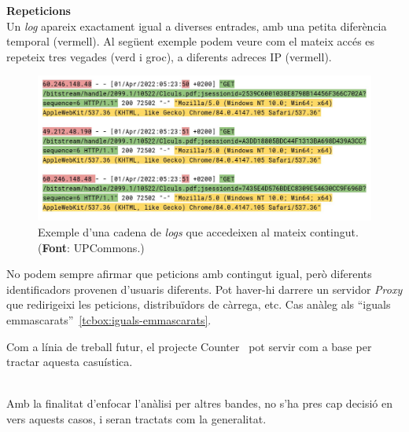 \clearpage

\noindent
\textbf{Repeticions} \\

\noindent
Un \textit{\gls{log}} apareix exactament igual a diverses entrades, amb una petita diferència temporal (vermell).
Al següent exemple podem veure com el mateix accés es repeteix tres vegades (verd i groc), a diferents adreces \gls{IP} (vermell).

\begin{figure}[htbp]
    \centerline{\includegraphics[width=\textwidth]{figures/log-repetitions}}
    \captionsetup{justification=centering}
    \caption{Exemple d'una cadena de \textit{\gls{log}s} que accedeixen al mateix contingut. (\textbf{Font}: \gls{UPCommons}.)}\label{fig:log-repetitions}
\end{figure}

\begin{tcolorbox}[colback=green!5!white, colframe=green!50!black, title=Divergència relativa]
    No podem sempre afirmar que peticions amb contingut igual, però diferents identificadors provenen d'usuaris diferents.
    Pot haver-hi darrere un servidor \textit{Proxy} que redirigeixi les peticions, distribuïdors de càrrega, etc.
    \tcblower
    Cas anàleg als ``iguals emmascarats''~\ref{tcbox:iguals-emmascarats}.
\end{tcolorbox}

\noindent
\begin{tcolorbox}[colback=blue!5!white, colframe=blue!75!black, title=Counter]
    Com a línia de treball futur, el projecte Counter~\cite{counter} pot servir com a base per tractar aquesta casuística.
\end{tcolorbox}

\noindent \\
Amb la finalitat d'enfocar l'anàlisi per altres bandes, no s'ha pres cap decisió en vers aquests casos, i seran tractats com la generalitat.

